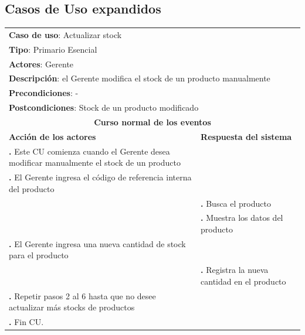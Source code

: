\documentclass[12pt]{extarticle}
\begin{document}
\begin{spacing}{1.2}
    

    \subsection{Casos de Uso expandidos}

    \newcommand\inc{\stepcounter{step}\textbf{\thestep. }}

    \newcommand\resetinc{\setcounter{step}{0}}

    \newcommand\raya{\noindent\rule{169mm}{0.8mm}\\}

    \newcommand\finCU{\resetinc{}\raya{}}


	\begin{longtable}{ |p{8cm}|p{8cm}| }
		\hline
		\multicolumn{2}{|p{16cm}|}{\textbf{Caso de uso}: Actualizar stock}\\
		\multicolumn{2}{|p{16cm}|}{\textbf{Tipo}: Primario Esencial}\\
		\multicolumn{2}{|p{16cm}|}{\textbf{Actores}: Gerente}\\
		\multicolumn{2}{|p{16cm}|}{\textbf{Descripción}: el Gerente modifica el stock de un producto manualmente}\\
		\multicolumn{2}{|p{16cm}|}{\textbf{Precondiciones}: -}\\
        \multicolumn{2}{|p{16cm}|}{\textbf{Postcondiciones}: Stock de un producto modificado}\\
		\hline
		\multicolumn{2}{|c|}{\textbf{Curso normal de los eventos}}\\
		\hline
		\textbf{Acción de los actores} & \textbf{Respuesta del sistema}\\
		\hline
			\inc Este CU comienza cuando el Gerente desea modificar manualmente el stock de un producto& \\
			\hline
			\inc  El Gerente ingresa el código de referencia interna del producto& \\
			\hline
		    & \inc Busca el producto \\
			\hline
			& \inc Muestra los datos del producto\\
			\hline


			\inc El Gerente ingresa una nueva cantidad de stock para el producto & \\
			\hline
			& \inc Registra la nueva cantidad en el producto\\
			\hline
			\inc  Repetir pasos 2 al 6 hasta que no desee actualizar más stocks de productos& \\
			\hline
			\inc Fin CU. & \\



\end{longtable}
\end{spacing}
\end{document}
